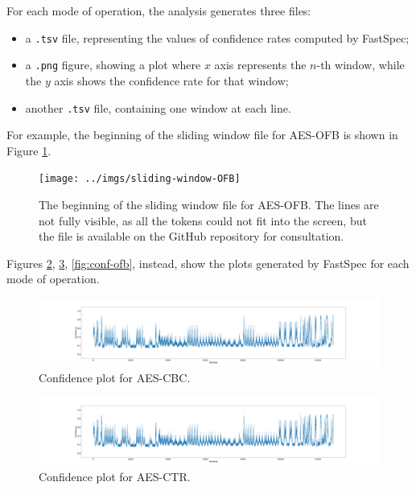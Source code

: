 \documentclass[12pt,a4paper]{book}
\theoremstyle{definition}
\begin{document}
	For each mode of operation, the analysis generates three files:
	\begin{itemize}
		\item a \texttt{.tsv} file, representing the values of confidence rates computed by FastSpec;
		\item a \texttt{.png} figure, showing a plot where $x$ axis represents the $n$-th window, while the $y$ axis shows the confidence rate for that window;
		\item another \texttt{.tsv} file, containing one window at each line.
	\end{itemize}
	
	For example, the beginning of the sliding window file for AES-OFB is shown in Figure \ref{fig:sliding-wnd}.
	
	\begin{figure}[!ht]
		\centering
		\texttt{[image: ../imgs/sliding-window-OFB]}
		\caption{The beginning of the sliding window file for AES-OFB. The lines are not fully visible, as all the tokens could not fit into the screen, but the file is available on the GitHub repository for consultation.}
		\label{fig:sliding-wnd}
	\end{figure}

	Figures \ref{fig:conf-cbc}, \ref{fig:conf-ctr}, \ref{fig:conf-ofb}, instead, show the plots generated by FastSpec for each mode of operation. 
	
	\begin{figure}[!ht]
		\hspace*{-3.6cm}
		\includegraphics[scale=0.18]{../test_files/output_nosymbolic_FastSpec_wider/window50_overlap49_fig/testing_AES_CBC_nosymbolic.png}
		\caption{Confidence plot for AES-CBC.}
		\label{fig:conf-cbc}
	\end{figure}

	\begin{figure}[!ht]
		\hspace*{-3.6cm}
		\includegraphics[scale=0.18]{../test_files/output_nosymbolic_FastSpec_wider/window50_overlap49_fig/testing_AES_CBC_nosymbolic.png}
		\caption{Confidence plot for AES-CTR.}
		\label{fig:conf-ctr}		
	\end{figure}
\end{document}
